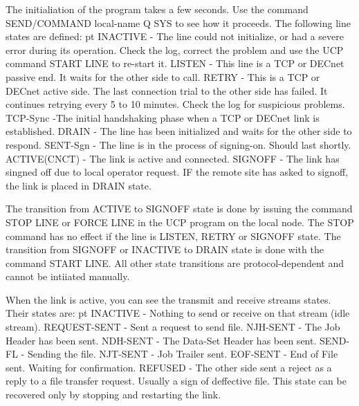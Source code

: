\vfill\eject


The initialiation of the program takes a few seconds. Use the command
{\ncrBold SEND/COMMAND local-name Q SYS}
 to see how it proceeds. The following line
states are defined:
{ pt \hfill\break
{\ncrBold INACTIVE} - 
The line could not initialize, or had a severe  error  during
its  operation.  Check  the  log,  correct  the  problem and use the UCP
command START LINE to re-start it.}
\hfill\break
{\ncrBold LISTEN} - 
This line is a TCP or DECnet passive  end.  It  waits  for  the
other side to call.
\hfill\break
{\ncrBold RETRY} - 
This is a TCP or DECnet active side. The last connection trial
to the other side has failed.  It  continues  retrying  every  5  to  10
minutes. Check the log for suspicious problems.
\hfill\break
{\ncrBold TCP-Sync} -The  initial handshaking phase when a TCP or DECnet link is
established.
\hfill\break
{\ncrBold DRAIN} -
The line has been initialized and waits for the  other  side  to
respond.
\hfill\break
{\ncrBold SENT-Sgn} -
The  line  is  in  the  process  of signing-on. Should last
shortly.
\hfill\break
{\ncrBold ACTIVE(CNCT)} - The link is active and connected.
\hfill\break
{\ncrBold SIGNOFF} -
The link has singned off due to  local  operator  request.  IF
the  remote  site  has  asked  to  signoff,  the link is placed in DRAIN
state.

The transition from ACTIVE to SIGNOFF state is done  by  issuing  the
command  STOP LINE  or  FORCE LINE in the UCP program on the local node.
The STOP command has no effect if the line is LISTEN, RETRY  or  SIGNOFF
state.  The  transition  from SIGNOFF or INACTIVE to DRAIN state is done
with  the  command  START  LINE.  All  other   state   transitions   are
protocol-dependent and cannot be intiiated manually.

When the link is active, you can see the transmit and receive streams
states. Their states are:
{ pt \hfill\break
{\ncrBold INACTIVE} - Nothing to send or receive on that stream (idle stream).}
\hfill\break
{\ncrBold REQUEST-SENT} - Sent a request to send file.
\hfill\break
{\ncrBold NJH-SENT} - The Job Header has been sent.
\hfill\break
{\ncrBold NDH-SENT} - The Data-Set Header has been sent.
\hfill\break
{\ncrBold SEND-FL} - Sending the file.
\hfill\break
{\ncrBold NJT-SENT} - Job Trailer sent.
\hfill\break
{\ncrBold EOF-SENT} - End of File sent. Waiting for confirmation.
\hfill\break
{\ncrBold REFUSED} - The other side sent a reject as a reply to a file transfer
request.  Usually a sign of deffective file. This state can be recovered
only by stopping and restarting the link.

